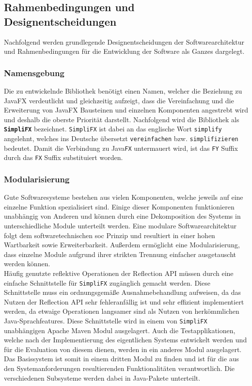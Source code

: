 \subsection{Rahmenbedingungen und Designentscheidungen}
\label{konzept_und_modellierung_designentscheidungen}
Nachfolgend werden grundlegende Designentscheidungen der Softwarearchitektur und Rahmenbedingungen für die Entwicklung der Software als Ganzes dargelegt.
\subsubsection{Namensgebung}
Die zu entwickelnde Bibliothek benötigt einen Namen, welcher die Beziehung zu JavaFX verdeutlicht und gleichzeitig aufzeigt, dass die Vereinfachung und die Erweiterung von JavaFX Bausteinen und einzelnen Komponenten angestrebt wird und deshalb die oberste Priorität darstellt. Nachfolgend wird die Bibliothek als \textbf{\texttt{SimpliFX}} bezeichnet. \texttt{SimpliFX} ist dabei an das englische Wort \texttt{simplify} angelehnt, welches ins Deutsche übersetzt \texttt{vereinfachen} bzw. \texttt{simplifizieren} bedeutet. Damit die Verbindung zu Java\texttt{FX} untermauert wird, ist das \texttt{FY} Suffix durch das \texttt{FX} Suffix substituiert worden.
\subsubsection{Modularisierung}
Gute Softwaresysteme bestehen aus vielen Komponenten, welche jeweils auf eine einzelne Funktion spezialisiert sind. Einige dieser Komponenten funktionieren unabhängig von Anderen und können durch eine Dekomposition des Systems in unterschiedliche Module unterteilt werden. Eine modulare Softwarearchitektur folgt dem softwaretechnischen \ac{soc} Prinzip und resultiert in einer hohen Wartbarkeit sowie Erweiterbarkeit. Außerdem ermöglicht eine Modularisierung, dass einzelne Module aufgrund ihrer strikten Trennung einfacher ausgetauscht werden können.\\
Häufig genutzte reflektive Operationen der Reflection API müssen durch eine einfache Schnittstelle für \texttt{SimpliFX} zugänglich gemacht werden. Diese Schnittstelle muss ein ordnungsgemäße Ausnahmebehandlung aufweisen, da das Nutzen der Reflection API sehr fehleranfällig ist und sehr effizient implementiert werden, da etwaige Operationen langsamer sind als Nutzen von herkömmlichen Java-Sprachfeatures. Diese Schnittstelle wird in einem von \texttt{SimpliFX} unabhängigen Apache Maven Modul ausgelagert. Auch die Testapplikationen, welche nach der Implementierung des eigentlichen Systems entwickelt werden und für die Evaluation von diesem dienen, werden in ein anderes Modul ausgelagert. Das Basissystem ist somit in einem dritten Modul zu finden und ist für die aus den Systemanforderungen resultierenden Funktionalitäten verantwortlich. Die verschiedenen Subsysteme werden dabei in Java-Pakete unterteilt.
